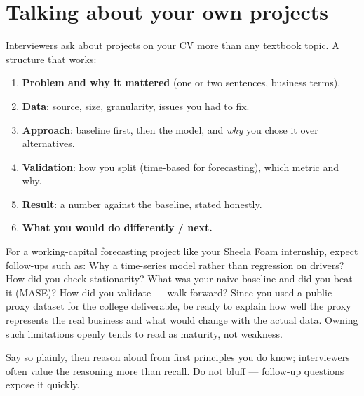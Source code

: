 \section{Talking about your own projects}
Interviewers ask about projects on your CV more than any textbook topic. A structure that works:
\begin{enumerate}
  \item \textbf{Problem and why it mattered} (one or two sentences, business terms).
  \item \textbf{Data}: source, size, granularity, issues you had to fix.
  \item \textbf{Approach}: baseline first, then the model, and \emph{why} you chose it over alternatives.
  \item \textbf{Validation}: how you split (time-based for forecasting), which metric and why.
  \item \textbf{Result}: a number against the baseline, stated honestly.
  \item \textbf{What you would do differently / next.}
\end{enumerate}
\begin{realworld}
For a working-capital forecasting project like your Sheela Foam internship, expect follow-ups such as: Why a time-series model rather than regression on drivers? How did you check stationarity? What was your naive baseline and did you beat it (MASE)? How did you validate --- walk-forward? Since you used a public proxy dataset for the college deliverable, be ready to explain how well the proxy represents the real business and what would change with the actual data. Owning such limitations openly tends to read as maturity, not weakness.
\end{realworld}

\A Say so plainly, then reason aloud from first principles you do know; interviewers often value the reasoning more than recall. Do not bluff --- follow-up questions expose it quickly.

